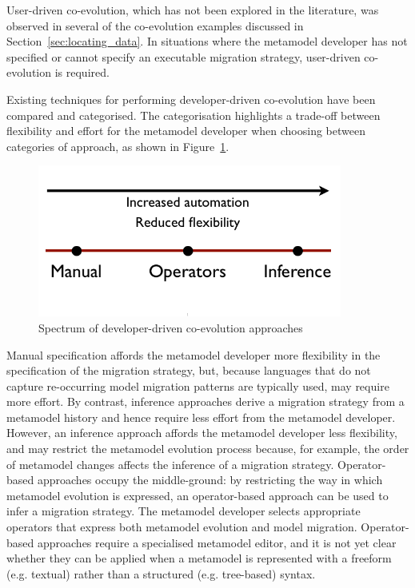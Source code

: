 User-driven co-evolution, which has not been explored in the literature, was observed in several of the co-evolution examples discussed in Section~\ref{sec:locating_data}. In situations where the metamodel developer has not specified or cannot specify an executable migration strategy, user-driven co-evolution is required.

Existing techniques for performing developer-driven co-evolution have been compared and categorised. The categorisation highlights a trade-off between flexibility and effort for the metamodel developer when choosing between categories of approach, as shown in Figure~\ref{fig:developer_driven_coevo_spectrum}.


\begin{figure}[htbp]
	\centering
		\includegraphics[width=10cm]{4.Analysis/spectrum.png}
	\caption{Spectrum of developer-driven co-evolution approaches}
	\label{fig:developer_driven_coevo_spectrum}
\end{figure}

Manual specification affords the metamodel developer more flexibility in the specification of the migration strategy, but, because languages that do not capture re-occurring model migration patterns are typically used, may require more effort. By contrast, inference approaches derive a migration strategy from a metamodel history and hence require less effort from the metamodel developer. However, an inference approach affords the metamodel developer less flexibility, and may restrict the metamodel evolution process because, for example, the order of metamodel changes affects the inference of a migration strategy. Operator-based approaches occupy the middle-ground: by restricting the way in which metamodel evolution is expressed, an operator-based approach can be used to infer a migration strategy. The metamodel developer selects appropriate operators that express both metamodel evolution and model migration. Operator-based approaches require a specialised metamodel editor, and it is not yet clear whether they can be applied when a metamodel is represented with a freeform (e.g. textual) rather than a structured (e.g. tree-based) syntax.


